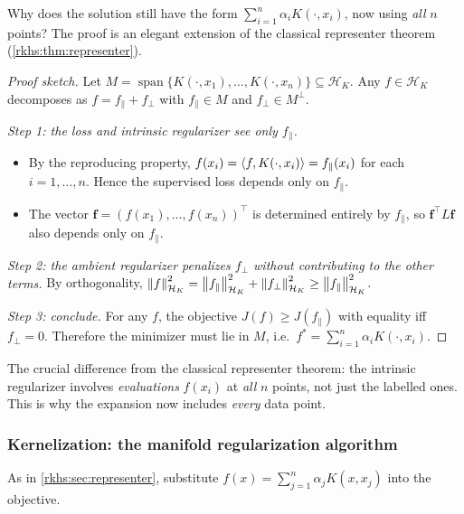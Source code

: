 \begin{notechapter}
Why does the solution still have the form $\sum_{i=1}^n \alpha_i
K(\cdot, x_i)$, now using \emph{all} $n$ points? The proof is an
elegant extension of the classical representer theorem
(\cref{rkhs:thm:representer}).

\begin{proof}[Proof sketch]
Let $M = \operatorname{span}\{K(\cdot, x_1), \ldots, K(\cdot, x_n)\} \subseteq \mathcal{H}_K$.
Any $f \in \mathcal{H}_K$ decomposes as $f = f_\parallel + f_\perp$ with
$f_\parallel \in M$ and $f_\perp \in M^\perp$.

\smallskip
\emph{Step 1: the loss and intrinsic regularizer see only $f_\parallel$.}
\begin{itemize}
  \item By the reproducing property, $f(x_i) = \left\langle f, K(\cdot, x_i) \right\rangle
    = f_\parallel(x_i)$ for each $i = 1,\ldots,n$. Hence the supervised
    loss depends only on $f_\parallel$.
  \item The vector $\mathbf{f} = (f(x_1),\ldots,f(x_n))^\top$ is determined
    entirely by $f_\parallel$, so $\mathbf{f}^\top L \mathbf{f}$ also
    depends only on $f_\parallel$.
\end{itemize}

\emph{Step 2: the ambient regularizer penalizes $f_\perp$ without
contributing to the other terms.}
By orthogonality, $\left\|f\right\|_{\mathcal{H}_K}^2 = \left\|f_\parallel\right\|_{\mathcal{H}_K}^2
+ \left\|f_\perp\right\|_{\mathcal{H}_K}^2 \geq \left\|f_\parallel\right\|_{\mathcal{H}_K}^2$.

\emph{Step 3: conclude.}
For any $f$, the objective $J(f) \geq J(f_\parallel)$ with equality
iff $f_\perp = 0$. Therefore the minimizer must lie in $M$, i.e.\
$f^* = \sum_{i=1}^n \alpha_i K(\cdot, x_i)$.
\end{proof}

\begin{remark}
The crucial difference from the classical representer theorem: the
intrinsic regularizer involves \emph{evaluations} $f(x_i)$ at
\emph{all} $n$ points, not just the labelled ones. This is why the
expansion now includes \emph{every} data point.
\end{remark}

\subsubsection*{Kernelization: the manifold regularization algorithm}

As in \cref{rkhs:sec:representer}, substitute
$f(x) = \sum_{j=1}^n \alpha_j K(x, x_j)$ into the objective.


\end{notechapter}
